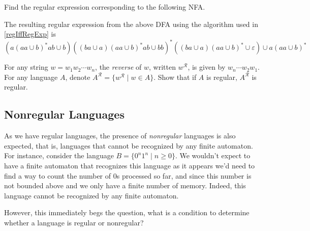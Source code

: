 \vspace{1mm}
\begin{exercise}
Find the regular expression corresponding to the following NFA.
\begin{center}
\end{center}
\end{exercise}
\begin{solution}
The resulting regular expression from the above DFA using the algorithm used in \ref{regIffRegExp} is
$$(a(aa\cup b)^*ab\cup b)((ba\cup a)(aa\cup b)^*ab\cup bb)^*((ba\cup a)(aa\cup b)^*\cup\varepsilon)\cup a(aa\cup b)^*$$
\end{solution}

\begin{exercise}
\label{stringreverse}
For any string $w=w_1w_2\cdots w_n$, the \textit{reverse} of $w$, written $w^\mathcal{R}$, is given by $w_n\cdots w_2w_1$. For any language $A$, denote $A^\mathcal{R}=\{w^\mathcal{R}\mid w\in A\}$. Show that if $A$ is regular, $A^\mathcal{R}$ is regular.
\end{exercise}
\clearpage

\subsection{Nonregular Languages}
As we have regular languages, the presence of \textit{nonregular} languages is also expected, that is, languages that cannot be recognized by any finite automaton. For instance, consider the language $B=\{0^n1^n\mid n\geq 0\}$. We wouldn't expect to have a finite automaton that recognizes this language as it appears we'd need to find a way to count the number of $0$s processed so far, and since this number is not bounded above and we only have a finite number of memory. Indeed, this language cannot be recognized by any finite automaton.

\vspace{2mm}
However, this immediately begs the question, what is a condition to determine whether a language is regular or nonregular? 


